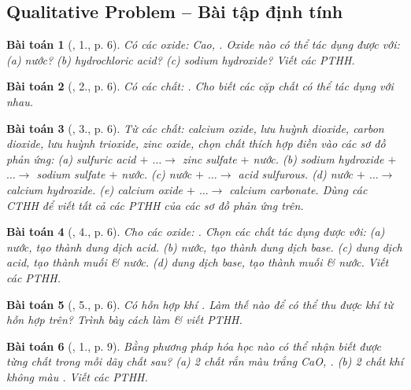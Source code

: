 \documentclass{article}
\newtheorem{baitoan}{Bài toán}
\begin{document}
\subsection{Qualitative Problem -- Bài tập định tính}

\begin{baitoan}[\cite{SGK_Hoa_Hoc_9}, 1., p. 6]
	Có các oxide: \emph{Cao, }. Oxide nào có thể tác dụng được với: (a) nước? (b) hydrochloric acid? (c) sodium hydroxide? Viết các PTHH.
\end{baitoan}

\begin{baitoan}[\cite{SGK_Hoa_Hoc_9}, 2., p. 6]
	Có các chất: \emph{}. Cho biết các cặp chất có thể tác dụng với nhau.
\end{baitoan}

\begin{baitoan}[\cite{SGK_Hoa_Hoc_9}, 3., p. 6]
	Từ các chất: calcium oxide, lưu huỳnh dioxide, carbon dioxide, lưu huỳnh trioxide, zinc oxide, chọn chất thích hợp điền vào các sơ đồ phản ứng: (a) sulfuric acid $+$ $\ldots\to$ zinc sulfate $+$ nước. (b) sodium hydroxide $+$ $\ldots\to$ sodium sulfate $+$ nước. (c) nước $+$ $\ldots\to$ acid sulfurous. (d) nước $+$ $\ldots\to$ calcium hydroxide. (e) calcium oxide $+$ $\ldots\to$ calcium carbonate. Dùng các CTHH để viết tất cả các PTHH của các sơ đồ phản ứng trên.
\end{baitoan}

\begin{baitoan}[\cite{SGK_Hoa_Hoc_9}, 4., p. 6]
	Cho các oxide: \emph{}. Chọn các chất tác dụng được với: (a) nước, tạo thành dung dịch acid. (b) nước, tạo thành dung dịch base. (c) dung dịch acid, tạo thành muối \& nước. (d) dung dịch base, tạo thành muối \& nước. Viết các PTHH.
\end{baitoan}

\begin{baitoan}[\cite{SGK_Hoa_Hoc_9}, 5., p. 6]
	Có hỗn hợp khí \emph{}. Làm thế nào để có thể thu được khí \emph{} từ hỗn hợp trên? Trình bày cách làm \& viết PTHH.
\end{baitoan}

\begin{baitoan}[\cite{SGK_Hoa_Hoc_9}, 1., p. 9]
	Bằng phương pháp hóa học nào có thể nhận biết được từng chất trong mỗi dãy chất sau? (a) 2 chất rắn màu trắng \emph{CaO, }. (b) 2 chất khí không màu \emph{}. Viết các PTHH.
\end{baitoan}
\end{document}
